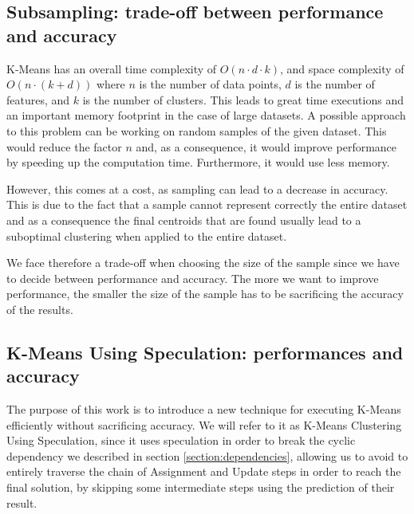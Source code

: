 \label{section:dependencies}

\subsection{Subsampling: trade-off between performance and accuracy}

K-Means has an overall time complexity of $O(n\cdot d\cdot k)$, and space complexity of $O(n\cdot(k+d))$ where $n$ is the number of data points, $d$ is the number of features, and  $k$ is the number of clusters. This leads to great time executions and an important memory footprint in the case of large datasets. 
A possible approach to this problem can be working on random samples of the given dataset. This would reduce the factor $n$ and, as a consequence, it would improve performance by speeding up the computation time. Furthermore, it would use less memory. 

However, this comes at a cost, as sampling can lead to a decrease in accuracy. This is due to the fact that a sample cannot represent correctly the entire dataset and as a consequence the final centroids that are found usually lead to a suboptimal clustering when applied to the entire dataset.

We face therefore a trade-off when choosing the size of the sample since we have to decide between performance and accuracy. The more we want to improve performance, the smaller the size of the sample has to be sacrificing the accuracy of the results.
\label{section:sampling}

\subsection{K-Means Using Speculation: performances and accuracy}

The purpose of this work is to introduce a new technique for executing K-Means efficiently without sacrificing accuracy. We will refer to it as K-Means Clustering Using Speculation, since it uses speculation in order to break the cyclic dependency we described in section \ref{section:dependencies}, allowing us to avoid to entirely traverse the chain of Assignment and Update steps in order to reach the final solution, by skipping some intermediate steps using the prediction of their result.  

